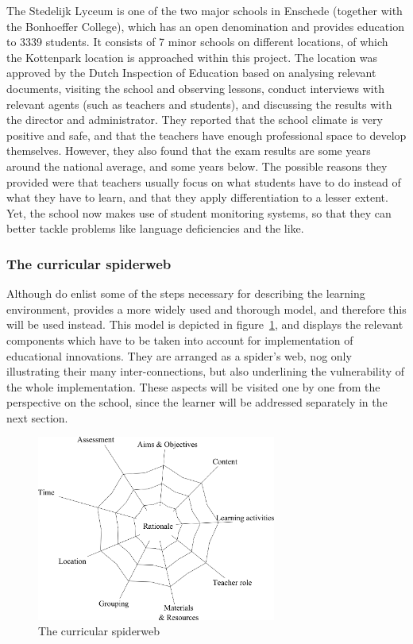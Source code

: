 The Stedelijk Lyceum is one of the two major schools in Enschede (together with the Bonhoeffer College), which has an open denomination and provides education to 3339 students. It consists of 7 minor schools on different locations, of which the Kottenpark location is approached within this project. The location was approved by the Dutch Inspection of Education \cite{inspectierapport} based on analysing relevant documents, visiting the school and observing lessons, conduct interviews with relevant agents (such as teachers and students), and discussing the results with the director and administrator. They reported that the school climate is very positive and safe, and that the teachers have enough professional space to develop themselves. However, they also found that the exam results are some years around the national average, and some years below. The possible reasons they provided were that teachers usually focus on what students have to do instead of what they have to learn, and that they apply differentiation to a lesser extent. Yet, the school now makes use of student monitoring systems, so that they can better tackle problems like language deficiencies and the like.

\subsubsection{The curricular spiderweb}

Although  do enlist some of the steps necessary for describing the learning environment,  provides a more widely used and thorough model, and therefore this will be used instead. This model is depicted in figure~\ref{fig:spiderweb}, and displays the relevant components which have to be taken into account for implementation of educational innovations. They are arranged as a spider's web, nog only illustrating their many inter-connections, but also underlining the vulnerability of the whole implementation. These aspects will be visited one by one from the perspective on the school, since the learner will be addressed separately in the next section.

\begin{figure}
    \centering
    \includegraphics[width=0.7\textwidth]{img/curricular_spiderweb.png}
    \caption{The curricular spiderweb \protect\cite{curricularspiderweb}}
    \label{fig:spiderweb}
\end{figure}

